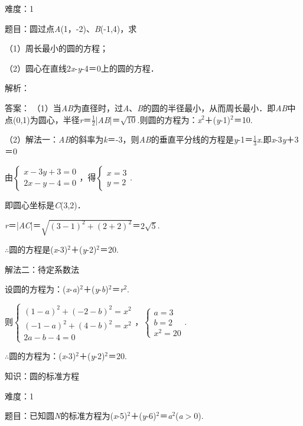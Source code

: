 \documentclass{article} %
\begin{document}
难度：1

题目：圆过点\textit{A}(1，-2)、\textit{B}(-1,4)，求

（1）周长最小的圆的方程；

（2）圆心在直线2\textit{x}-\textit{y}-4＝0上的圆的方程．

解析：

答案：
（1）当\textit{AB}为直径时，过\textit{A}、\textit{B}的圆的半径最小，从而周长最小．即\textit{AB}中点(0,1)为圆心，半径\textit{r}＝$\frac{1}{2}$|\textit{AB}|＝$\sqrt{10}$.则圆的方程为：\textit{x}${}^{2}$＋(\textit{y}-1)${}^{2}$＝10.

（2）解法一：\textit{AB}的斜率为\textit{k}＝-3，则\textit{AB}的垂直平分线的方程是\textit{y}-1＝$\frac{1}{3}$\textit{x}.即\textit{x}-3\textit{y}＋3＝0

由$\left\{\begin{array}{r} x-3y+3=0\\ 2x-y-4=0 \end{array} \right.$，得$\left\{\begin{array}{r} x=3\\ y=2 \end{array} \right.$.

即圆心坐标是\textit{C}(3,2)．

\textit{r}＝|\textit{AC}|＝$\sqrt{(3-1)^2+(2+2)^2}$＝$2\sqrt{5}$.

$\mathrm{\therefore}$圆的方程是(\textit{x}-3)${}^{2}$＋(\textit{y}-2)${}^{2}$＝20.

解法二：待定系数法

设圆的方程为：(\textit{x}-\textit{a})${}^{2}$＋(\textit{y}-\textit{b})${}^{2}$＝\textit{r}${}^{2}$.

则$\left\{\begin{array}{r} (1-a)^2+(-2-b)^2=x^2\\ (-1-a)^2+(4-b)^2=x^2\\ 2a-b-4=0 \end{array} \right.$，$\left\{\begin{array}{r} a=3\\ b=2\\ x^2=20 \end{array} \right.$.

$\mathrm{\therefore}$圆的方程为：(\textit{x}-3)${}^{2}$＋(\textit{y}-2)${}^{2}$＝20.

知识：圆的标准方程

难度：1

题目：已知圆\textit{N}的标准方程为(\textit{x}-5)${}^{2}$＋(\textit{y}-6)${}^{2}$＝\textit{a}${}^{2}$(\textit{a}$\mathrm{>}$0).
\end{document}
